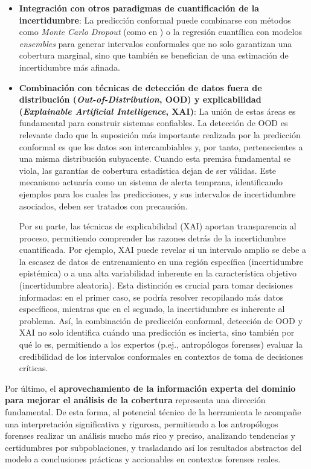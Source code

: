 \begin{itemize}

    \item \textbf{Integración con otros paradigmas de cuantificación de la incertidumbre}: La predicción conformal puede combinarse con métodos como \textit{Monte Carlo Dropout} (como en \cite{bethell2024}) o la regresión cuantílica con modelos \textit{ensembles} para generar intervalos conformales que no solo garantizan una cobertura marginal, sino que también se benefician de una estimación de incertidumbre más afinada. 
    
    \item \textbf{Combinación con técnicas de detección de datos fuera de distribución (\textit{Out-of-Distribution}, OOD) y explicabilidad (\textit{Explainable Artificial Intelligence}, XAI)}: La unión de estas áreas es fundamental para construir sistemas confiables. 
    La detección de OOD es relevante dado que la suposición más importante realizada por la predicción conformal es que los datos son intercambiables y, por tanto, pertenecientes a una misma distribución subyacente. Cuando esta premisa fundamental se viola, las garantías de cobertura estadística dejan de ser válidas. Este mecanismo actuaría como un sistema de alerta temprana, identificando ejemplos para los cuales las predicciones, y sus intervalos de incertidumbre asociados, deben ser tratados con precaución.
    
    Por su parte, las técnicas de explicabilidad (XAI) aportan transparencia al proceso, permitiendo comprender las razones detrás de la incertidumbre cuantificada. Por ejemplo, XAI puede revelar si un intervalo amplio se debe a la escasez de datos de entrenamiento en una región específica (incertidumbre epistémica) o a una alta variabilidad inherente en la característica objetivo (incertidumbre aleatoria). Esta distinción es crucial para tomar decisiones informadas: en el primer caso, se podría resolver recopilando más datos específicos, mientras que en el segundo, la incertidumbre es inherente al problema. Así, la combinación de predicción conformal, detección de OOD y XAI no solo identifica cuándo una predicción es incierta, sino también por qué lo es, permitiendo a los expertos (p.ej., antropólogos forenses) evaluar la credibilidad de los intervalos conformales en contextos de toma de decisiones críticas.

\end{itemize}

Por último, el \textbf{aprovechamiento de la información experta del dominio para mejorar el análisis de la cobertura} representa una dirección fundamental. De esta forma, al potencial técnico de la herramienta le acompañe una interpretación significativa y rigurosa, permitiendo a los antropólogos forenses realizar un análisis mucho más rico y preciso, analizando tendencias y certidumbres por subpoblaciones, y trasladando así los resultados abstractos del modelo a conclusiones prácticas y accionables en contextos forenses reales.